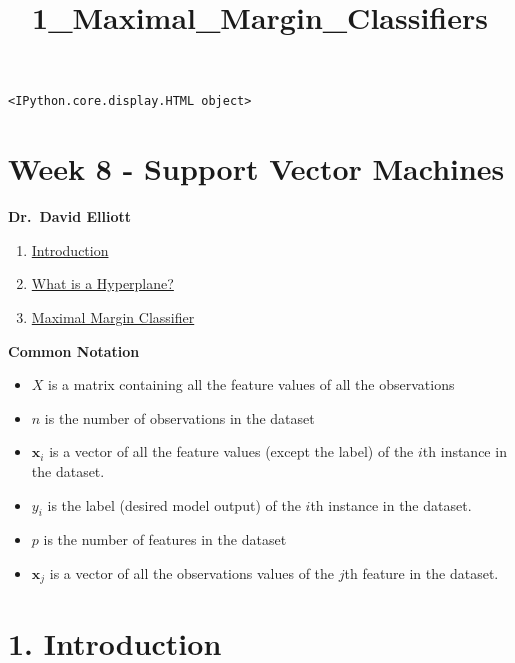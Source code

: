 \documentclass[11pt]{article}
\title{1\_Maximal\_Margin\_Classifiers}
\providecommand{\tightlist}{%
      \setlength{\itemsep}{0pt}\setlength{\parskip}{0pt}}
\begin{document}
    
    \maketitle
    
    

    
            \begin{tcolorbox}[breakable, size=fbox, boxrule=.5pt, pad at break*=1mm, opacityfill=0]
\begin{Verbatim}[commandchars=\\\{\}]
<IPython.core.display.HTML object>
\end{Verbatim}
\end{tcolorbox}
        
    \hypertarget{week-8---support-vector-machines}{%
\section{Week 8 - Support Vector
Machines}\label{week-8---support-vector-machines}}

\textbf{Dr.~David Elliott}

\begin{enumerate}
\def\labelenumi{\arabic{enumi}.}
\item
  \hyperref[intro]{Introduction}
\item
  \hyperref[hyperplane]{What is a Hyperplane?}
\item
  \hyperref[mmc]{Maximal Margin Classifier}
\end{enumerate}

    \textbf{Common Notation}

\begin{itemize}
\tightlist
\item
  \(X\) is a matrix containing all the feature values of all the
  observations
\item
  \(n\) is the number of observations in the dataset
\item
  \(\mathbf{x}_i\) is a vector of all the feature values (except the
  label) of the \(i\)th instance in the dataset.
\item
  \(y_i\) is the label (desired model output) of the \(i\)th instance in
  the dataset.
\item
  \(p\) is the number of features in the dataset
\item
  \(\mathbf{x}_j\) is a vector of all the observations values of the
  \(j\)th feature in the dataset.
\end{itemize}

    \hypertarget{introduction}{%
\section{\texorpdfstring{1. Introduction
}{1. Introduction }}\label{introduction}}
\end{document}
